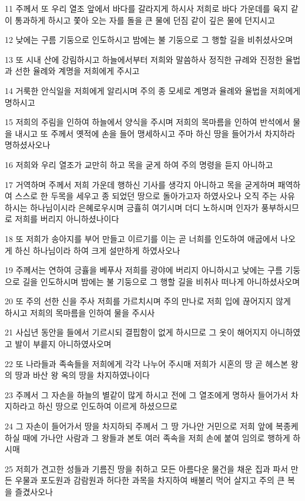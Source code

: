 \par 11 주께서 또 우리 열조 앞에서 바다를 갈라지게 하시사 저희로 바다 가운데를 육지 같이 통과하게 하시고 쫓아 오는 자를 돌을 큰 물에 던짐 같이 깊은 물에 던지시고
\par 12 낮에는 구름 기둥으로 인도하시고 밤에는 불 기둥으로 그 행할 길을 비취셨사오며
\par 13 또 시내 산에 강림하시고 하늘에서부터 저희와 말씀하사 정직한 규례와 진정한 율법과 선한 율례와 계명을 저희에게 주시고
\par 14 거룩한 안식일을 저희에게 알리시며 주의 종 모세로 계명과 율례와 율법을 저희에게 명하시고
\par 15 저희의 주림을 인하여 하늘에서 양식을 주시며 저희의 목마름을 인하여 반석에서 물을 내시고 또 주께서 옛적에 손을 들어 맹세하시고 주마 하신 땅을 들어가서 차지하라 명하셨사오나
\par 16 저희와 우리 열조가 교만히 하고 목을 굳게 하여 주의 명령을 듣지 아니하고
\par 17 거역하며 주께서 저희 가운데 행하신 기사를 생각지 아니하고 목을 굳게하며 패역하여 스스로 한 두목을 세우고 종 되었던 땅으로 돌아가고자 하였사오나 오직 주는 사유하시는 하나님이시라 은혜로우시며 긍휼히 여기시며 더디 노하시며 인자가 풍부하시므로 저희를 버리지 아니하셨나이다
\par 18 또 저희가 송아지를 부어 만들고 이르기를 이는 곧 너희를 인도하여 애굽에서 나오게 하신 하나님이라 하여 크게 설만하게 하였사오나
\par 19 주께서는 연하여 긍휼을 베푸사 저희를 광야에 버리지 아니하시고 낮에는 구름 기둥으로 길을 인도하시며 밤에는 불 기둥으로 그 행할 길을 비취사 떠나게 아니하셨사오며
\par 20 또 주의 선한 신을 주사 저희를 가르치시며 주의 만나로 저희 입에 끊어지지 않게 하시고 저희의 목마름을 인하여 물을 주시사
\par 21 사십년 동안을 들에서 기르시되 결핍함이 없게 하시므로 그 옷이 해어지지 아니하였고 발이 부릍지 아니하였사오며
\par 22 또 나라들과 족속들을 저희에게 각각 나누어 주시매 저희가 시혼의 땅 곧 헤스본 왕의 땅과 바산 왕 옥의 땅을 차지하였나이다
\par 23 주께서 그 자손을 하늘의 별같이 많게 하시고 전에 그 열조에게 명하사 들어가서 차지하라고 하신 땅으로 인도하여 이르게 하셨으므로
\par 24 그 자손이 들어가서 땅을 차지하되 주께서 그 땅 가나안 거민으로 저희 앞에 복종케 하실 때에 가나안 사람과 그 왕들과 본토 여러 족속을 저희 손에 붙여 임의로 행하게 하시매
\par 25 저희가 견고한 성들과 기름진 땅을 취하고 모든 아름다운 물건을 채운 집과 파서 만든 우물과 포도원과 감람원과 허다한 과목을 차지하여 배불리 먹어 살지고 주의 큰 복을 즐겼사오나
